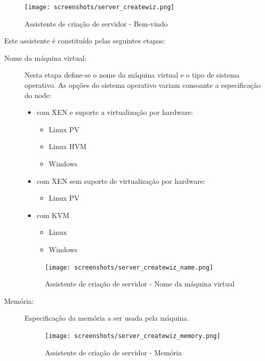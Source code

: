 \begin{figure}[H]
	\begin{center}
	\texttt{[image: screenshots/server\_createwiz.png]}
	\caption{Assistente de criação de servidor - Bem-vindo}
	\label{fig:server_createwiz}
	\end{center}
\end{figure}
Este assistente é constituído pelas seguintes etapas:
\begin{description}
	\item[Nome da máquina virtual:] Nesta etapa define-se o nome da máquina virtual e o tipo de sistema operativo. As opções do sistema operativo variam consoante a especificação do node:
		\begin{itemize}
			\item com XEN e suporte a virtualização por hardware:
			\begin{itemize}
				\item Linux PV
				\item Linux HVM
				\item Windows
			\end{itemize}
 			\item com XEN sem suporte de virtualização por hardware:
			\begin{itemize}
				\item Linux PV
			\end{itemize}
 			\item com KVM
			\begin{itemize}
				\item Linux
				\item Windows
			\end{itemize}
		\end{itemize}
	
		\begin{figure}[H]
        		\begin{center}
		        \texttt{[image: screenshots/server\_createwiz\_name.png]}
        		\caption{Assistente de criação de servidor - Nome da máquina virtual}
	        	\label{fig:server_createwiz_name}
	        	\end{center}
		\end{figure}
 
	\item[Memória:] Especificação da memória a ser usada pela máquina.
		\begin{figure}[H]
        		\begin{center}
		        \texttt{[image: screenshots/server\_createwiz\_memory.png]}
        		\caption{Assistente de criação de servidor - Memória}
	        	\label{fig:server_createwiz_memory}
	        	\end{center}
		\end{figure}


\end{description}
